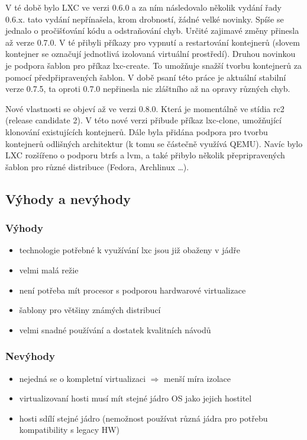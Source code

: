 V té době bylo LXC ve verzi 0.6.0 a za ním následovalo několik vydání řady 0.6.x. tato vydání nepřínašela, krom drobností, žádné velké novinky. Spíše se jednalo o pročišťování kódu a odstraňování chyb. Určité zajimavé změny přinesla až verze 0.7.0. V té přibyli příkazy pro vypnutí a restartování kontejnerů (slovem kontejner se označují jednotlivá izolovaná virtuální prostředí). Druhou novinkou je podpora šablon pro příkaz lxc-create. To umožňuje snažší tvorbu kontejnerů za pomocí předpřipravených šablon. V době psaní této práce je aktuální stabilní verze 0.7.5, ta oproti 0.7.0 nepřinesla nic zláštního až na opravy různých chyb. 

Nové vlastnosti se objeví až ve verzi 0.8.0. Která je momentálně ve stídia rc2 (release candidate 2). V této nové verzi přibude příkaz lxc-clone, umožňující klonování existujících kontejnerů. Dále byla přidána podpora pro tvorbu kontejnerů odlišných architektur (k tomu se částečně využívá QEMU). Navíc bylo LXC rozšířeno o podporu btrfs a lvm, a také přibylo několik přepripravených šablon pro různé distribuce (Fedora, Archlinux \dots).

\subsection{Výhody a nevýhody}

\subsubsection{Výhody}
\begin{itemize}
  \item technologie potřebné k využívání lxc jsou již obaženy v jádře
  \item velmi malá režie
  \item není potřeba mít procesor s podporou hardwarové virtualizace
  \item šablony pro většiny známých distribucí
  \item velmi snadné používání a dostatek kvalitních návodů 
\end{itemize}

\subsubsection{Nevýhody}
\begin{itemize}
  \item nejedná se o kompletní virtualizaci $\Rightarrow$ menší míra izolace
  \item virtualizovaní hosti musí mít stejné jádro OS jako jejich hostitel
  \item hosti sdílí stejné jádro (nemožnost používat různá jádra pro potřebu kompatibility s legacy HW)
\end{itemize}
  
